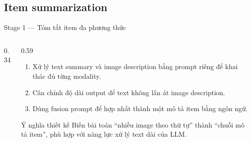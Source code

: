 \subsection{Item summarization}
\begin{frame}{Stage 1 — Tóm tắt item đa phương thức}
  \begin{columns}[T,onlytextwidth]
    \begin{column}{0.34\textwidth}\centering
    \end{column}
    \begin{column}{0.59\textwidth}\small
      \begin{enumerate}
        \item Xử lý text summary và image description bằng prompt riêng để khai thác đủ từng modality.
        \item Cân chỉnh độ dài output để text không lấn át image description.
        \item Dùng fusion prompt để hợp nhất thành một mô tả item bằng ngôn ngữ.
      \end{enumerate}
      \begin{block}{\scriptsize Ý nghĩa thiết kế}
        \scriptsize
        Biến bài toán “nhiều image theo thứ tự” thành “chuỗi mô tả item”, phù hợp với năng lực xử lý text dài của LLM.
      \end{block}
    \end{column}
  \end{columns}
\end{frame}

